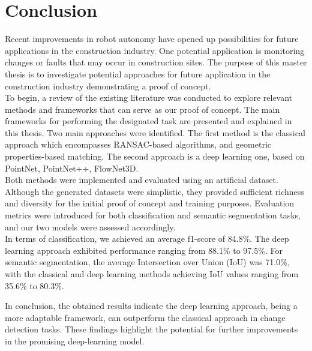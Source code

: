 \chapter{Conclusion}
Recent improvements in robot autonomy have opened up possibilities for future applications in the construction industry. One potential application is monitoring changes or faults that may occur in construction sites. The purpose of this master thesis is to investigate potential approaches for future application in the construction industry demonstrating a proof of concept.\\

To begin, a review of the existing literature was conducted to explore relevant methods and frameworks that can serve as our proof of concept. The main frameworks for performing the designated task are presented and explained in this thesis. Two main approaches were identified. The first method is the classical approach which encompasses RANSAC-based algorithms, and geometric properties-based matching. The second approach is a deep learning one, based on PointNet, PointNet++, FlowNet3D.\\

Both methods were implemented and evaluated using an artificial dataset. Although the generated datasets were simplistic, they provided sufficient richness and diversity for the initial proof of concept and training purposes. Evaluation metrics were introduced for both classification and semantic segmentation tasks, and our two models were assessed accordingly.\\

In terms of classification, we achieved an average f1-score of 84.8\%. The deep learning approach exhibited performance ranging from 88.1\% to 97.5\%. For semantic segmentation, the average Intersection over Union (IoU) was 71.0\%, with the classical and deep learning methods achieving IoU values ranging from 35.6\% to 80.3\%.

In conclusion, the obtained results indicate the deep learning approach, being a more adaptable framework, can outperform the classical approach in change detection tasks. These findings highlight the potential for further improvements in the promising deep-learning model.
